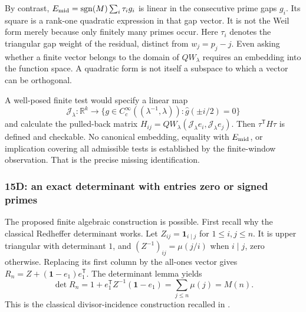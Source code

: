 By contrast, $E_{\rm mid}=\operatorname{sgn}(M)\sum_i \tau_i g_i$ is
linear in the consecutive prime gaps $g_i$. Its square is a rank-one
quadratic expression in that gap vector. It is not the Weil form merely
because only finitely many primes occur. Here $\tau_i$ denotes the triangular
gap weight of the residual, distinct from $w_j=p_j-j$.
Even asking whether a finite vector belongs to the domain of
$QW_\lambda$ requires an embedding into the function space.
A quadratic form is not itself a subspace to which a vector can be
orthogonal.

A well-posed finite test would specify a linear map
\begin{equation}
\label{eq:a12-Weil-embedding}
\mathcal J_\lambda:\mathbb R^k\longrightarrow
\{g\in C_c^\infty((\lambda^{-1},\lambda)):
\widehat g(\pm i/2)=0\}
\end{equation}
and calculate the pulled-back matrix
$H_{ij}=QW_\lambda(\mathcal J_\lambda e_i,\mathcal J_\lambda e_j)$.
Then $\tau^\mathsf{T}H\tau$ is defined and checkable.
No canonical embedding, equality with $E_{\rm mid}$, or implication
covering all admissible tests is established by the finite-window
observation. That is the precise missing identification.

\subsubsection{15D: an exact determinant with entries zero or signed primes}
\label{subsubsec:a12-determinant}
The proposed finite algebraic construction is possible.
First recall why the classical Redheffer determinant works. Let
$Z_{ij}=\mathbf1_{i\mid j}$ for $1\le i,j\le n$.
It is upper triangular with determinant $1$, and
$(Z^{-1})_{ij}=\mu(j/i)$ when $i\mid j$, zero otherwise.
Replacing its first column by the all-ones vector gives
$R_n=Z+(\mathbf1-e_1)e_1^\mathsf{T}$. The determinant lemma yields
\begin{equation}
\label{eq:a12-Redheffer}
\det R_n=1+e_1^\mathsf{T}Z^{-1}(\mathbf1-e_1)
=\sum_{j\le n}\mu(j)=M(n).
\end{equation}
This is the classical divisor-incidence construction recalled in
\cite{Connes2026}.

